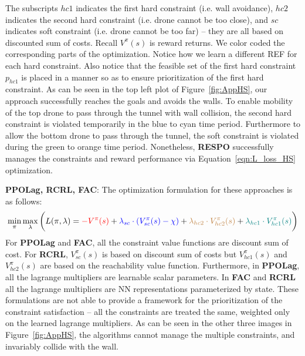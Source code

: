 \documentclass{article}
\theoremstyle{definition}
\begin{document}
The subscripts $hc1$ indicates the first hard constraint (i.e. wall avoidance), $hc2$ indicates the second hard constraint (i.e. drone cannot be too close), and $sc$ indicates soft constraint (i.e. drone cannot be too far) -- they are all based on discounted sum of costs. Recall $V^\pi(s)$ is reward returns. We color coded the corresponding parts of the optimization. Notice how we learn a different REF for each hard constraint. Also notice that the feasible set of the first hard constraint $p_{hc1}$ is placed in a manner so as to ensure prioritization of the first hard constraint. As can be seen in the top left plot of Figure~\ref{fig:AppHS}, our approach successfully reaches the goals and avoids the walls. To enable mobility of the top drone to pass through the tunnel with wall collision, the second hard constraint is violated temporarily in the blue to cyan time period. Furthermore to allow the bottom drone to pass through the tunnel, the soft constraint is violated during the green to orange time period. Nonetheless, \textbf{RESPO} successfully manages the constraints and reward performance via Equation~\ref{eqn:L_loss_HS} optimization.

\textbf{PPOLag, RCRL, FAC}:
The optimization formulation for these approaches is as follows:
\begin{equation}
\begin{split}
\label{eqn:L_loss_HS_Baselines}    
\min_\pi \max_\lambda \bigg( L(\pi, \lambda) =  {\color{red} -V^\pi(s) }+ {\color{blue} \lambda_{sc}\cdot (V^\pi_{sc}(s) - \chi)} + {\color{brown}\lambda_{hc2}\cdot V^\pi_{hc2}(s)} + {\color{teal} \lambda_{hc1}\cdot V^\pi_{hc1}(s)}\bigg)
\end{split}
\end{equation}
For \textbf{PPOLag} and \textbf{FAC}, all the constraint value functions are discount sum of cost. For \textbf{RCRL}, $V^\pi_{sc}(s)$ is based on discount sum of costs but $V^\pi_{hc1}(s)$ and $V^\pi_{hc2}(s)$ are based on the reachability value function. Furthermore, in \textbf{PPOLag}, all the lagrange multipliers are learnable scalar parameters. In \textbf{FAC} and \textbf{RCRL} all the lagrange multipliers are NN representations parameterized by state. These formulations are not able to provide a framework for the prioritization of the constraint satisfaction -- all the constraints are treated the same, weighted only on the learned lagrange multipliers. As can be seen in the other three images in Figure~\ref{fig:AppHS}, the algorithms cannot manage the multiple constraints, and invariably collide with the wall.
\end{document}

